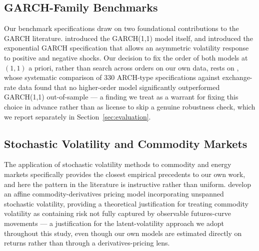 \documentclass[preprint,12pt,authoryear]{elsarticle}
\begin{document}
\subsection{GARCH-Family Benchmarks}

Our benchmark specifications draw on two foundational contributions to the GARCH literature. \citet{bollerslev1986} introduced the GARCH(1,1) model itself, and \citet{nelson1991} introduced the exponential GARCH specification that allows an asymmetric volatility response to positive and negative shocks. Our decision to fix the order of both models at $(1,1)$ a priori, rather than search across orders on our own data, rests on \citet{hansenlunde2005}, whose systematic comparison of 330 ARCH-type specifications against exchange-rate data found that no higher-order model significantly outperformed GARCH(1,1) out-of-sample --- a finding we treat as a warrant for fixing this choice in advance rather than as license to skip a genuine robustness check, which we report separately in Section~\ref{sec:evaluation}.

\subsection{Stochastic Volatility and Commodity Markets}

The application of stochastic volatility methods to commodity and energy markets specifically provides the closest empirical precedents to our own work, and here the pattern in the literature is instructive rather than uniform. \citet{trolleschwartz2009} develop an affine commodity-derivatives pricing model incorporating unspanned stochastic volatility, providing a theoretical justification for treating commodity volatility as containing risk not fully captured by observable futures-curve movements --- a justification for the latent-volatility approach we adopt throughout this study, even though our own models are estimated directly on returns rather than through a derivatives-pricing lens.
\end{document}
